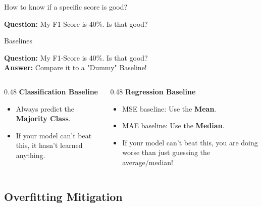 
\begin{frame}{How to know if a specific score is good?}

    \textbf{Question:} My F1-Score is 40\%. Is that good?
\end{frame}
    
\begin{frame}{Baselines}

    \textbf{Question:} My F1-Score is 40\%. Is that good?
    \vspace{0.5em}
    \\
    \textbf{Answer:} Compare it to a "Dummy" Baseline!
    
    \vspace{1em}
    
    \begin{columns}[T]
        \begin{column}{0.48\textwidth}
            \textbf{Classification Baseline}
            \begin{itemize}
                \item Always predict the \textbf{Majority Class}.
                \item If your model can't beat this, it hasn't learned anything.
            \end{itemize}
        \end{column}
        \begin{column}{0.48\textwidth}
            \textbf{Regression Baseline}
            \begin{itemize}
                \item MSE baseline: Use the \textbf{Mean}.
                \item MAE baseline: Use the \textbf{Median}.
                \item If your model can't beat this, you are doing worse than just guessing the average/median!
            \end{itemize}
        \end{column}
    \end{columns}
    
\end{frame}

\subsection{Overfitting Mitigation}


